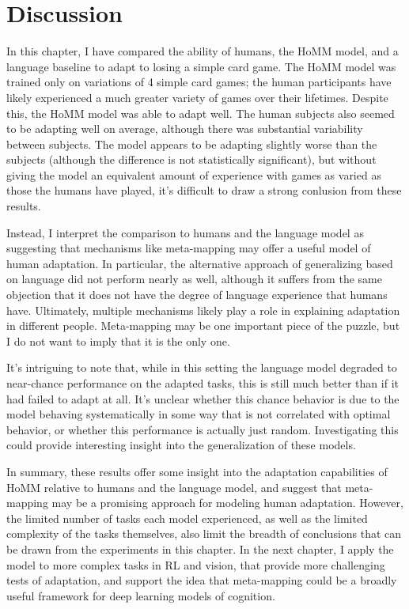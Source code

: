 \section{Discussion}

In this chapter, I have compared the ability of humans, the HoMM model, and a language baseline to adapt to losing a simple card game. The HoMM model was trained only on variations of 4 simple card games; the human participants have likely experienced a much greater variety of games over their lifetimes. Despite this, the HoMM model was able to adapt well. The human subjects also seemed to be adapting well on average, although there was substantial variability between subjects. The model appears to be adapting slightly worse than the subjects (although the difference is not statistically significant), but without giving the model an equivalent amount of experience with games as varied as those the humans have played, it's difficult to draw a strong conlusion from these results. \par
Instead, I interpret the comparison to humans and the language model as suggesting that mechanisms like meta-mapping may offer a useful model of human adaptation. In particular, the alternative approach of generalizing based on language did not perform nearly as well, although it suffers from the same objection that it does not have the degree of language experience that humans have. Ultimately, multiple mechanisms likely play a role in explaining adaptation in different people. Meta-mapping may be one important piece of the puzzle, but I do not want to imply that it is the only one. \par 
It's intriguing to note that, while in this setting the language model degraded to near-chance performance on the adapted tasks, this is still much better than if it had failed to adapt at all. It's unclear whether this chance behavior is due to the model behaving systematically in some way that is not correlated with optimal behavior, or whether this performance is actually just random. Investigating this could provide interesting insight into the generalization of these models. \par
In summary, these results offer some insight into the adaptation capabilities of HoMM relative to humans and the language model, and suggest that meta-mapping may be a promising approach for modeling human adaptation. However, the limited number of tasks each model experienced, as well as the limited complexity of the tasks themselves, also limit the breadth of conclusions that can be drawn from the experiments in this chapter. In the next chapter, I apply the model to more complex tasks in RL and vision, that provide more challenging tests of adaptation, and support the idea that meta-mapping could be a broadly useful framework for deep learning models of cognition. \par  

